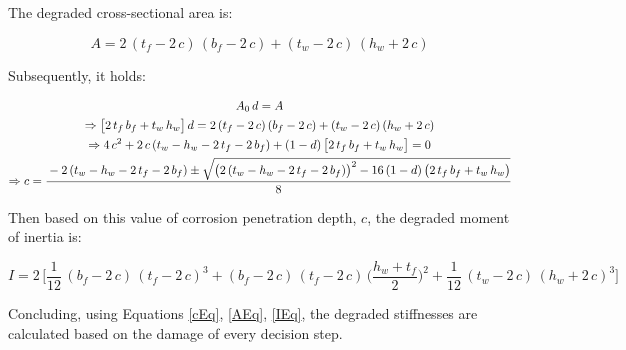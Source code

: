 The degraded cross-sectional area is:

\begin{equation}
    A = 2\, (t_f - 2\, c) \, (b_f - 2\, c) + (t_w - 2\,c)\,(h_w+2\,c) \label{AEq}
\end{equation}

\newpage

Subsequently, it holds:

\begin{gather}
    A_0 \, d = A \nonumber \\ 
    \Rightarrow \big[ 2 \, t_f \, b_f + t_w \, h_w \big] \, d = 2\, (t_f - 2\, c) \, (b_f - 2\, c) + (t_w - 2\,c)\,(h_w+2\,c) \nonumber \\ 
    \Rightarrow 4 \, c^2 + 2\,c\,(t_w-h_w - 2\,t_f - 2\,b_f) + (1 - d)\, \big[ 2 \, t_f \, b_f + t_w \, h_w \big] = 0 \nonumber \\ 
    \Rightarrow c = \cfrac{- 2\,(t_w-h_w - 2\,t_f - 2\,b_f) \pm \sqrt{\big(2\,(t_w-h_w - 2\,t_f - 2\,b_f)\big)^2 - 16\,(1 - d)\, \big(2 \, t_f \, b_f + t_w \, h_w \big)}}{8} \label{cEq}
\end{gather}

Then based on this value of corrosion penetration depth, $c$, the degraded moment of inertia is:

\begin{equation}
    I = 2 \, \Big[ \frac{1}{12}\, (b_f - 2\,c)\,(t_f-2\,c)^3 + (b_f-2\,c)\,(t_f-2\,c)\,\big( \frac{h_w+t_f}{2} \big) ^2 + \frac{1}{12}\,(t_w-2\,c)\,(h_w+2\,c)^3 \Big] \label{IEq}
\end{equation}

Concluding, using Equations \ref{cEq}, \ref{AEq}, \ref{IEq}, the degraded stiffnesses are calculated based on the damage of every decision step.
